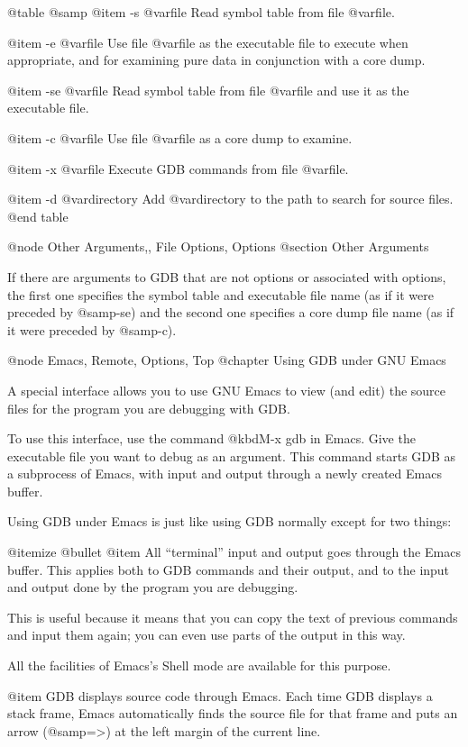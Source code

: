 @table @samp
@item -s @var{file}
Read symbol table from file @var{file}.

@item -e @var{file}
Use file @var{file} as the executable file to execute when
appropriate, and for examining pure data in conjunction with a core
dump.

@item -se @var{file}
Read symbol table from file @var{file} and use it as the executable
file.

@item -c @var{file}
Use file @var{file} as a core dump to examine.

@item -x @var{file}
Execute GDB commands from file @var{file}.

@item -d @var{directory}
Add @var{directory} to the path to search for source files.
@end table

@node Other Arguments,, File Options, Options
@section Other Arguments

If there are arguments to GDB that are not options or associated with
options, the first one specifies the symbol table and executable file name
(as if it were preceded by @samp{-se}) and the second one specifies a core
dump file name (as if it were preceded by @samp{-c}).

@node Emacs, Remote, Options, Top
@chapter Using GDB under GNU Emacs

A special interface allows you to use GNU Emacs to view (and
edit) the source files for the program you are debugging with
GDB.

To use this interface, use the command @kbd{M-x gdb} in Emacs.  Give the
executable file you want to debug as an argument.  This command starts
GDB as a subprocess of Emacs, with input and output through a newly
created Emacs buffer.

Using GDB under Emacs is just like using GDB normally except for two
things:

@itemize @bullet
@item
All ``terminal'' input and output goes through the Emacs buffer.  This
applies both to GDB commands and their output, and to the input and
output done by the program you are debugging.

This is useful because it means that you can copy the text of previous
commands and input them again; you can even use parts of the output
in this way.

All the facilities of Emacs's Shell mode are available for this purpose.

@item
GDB displays source code through Emacs.  Each time GDB displays a
stack frame, Emacs automatically finds the source file for that frame
and puts an arrow (@samp{=>}) at the left margin of the current line.

